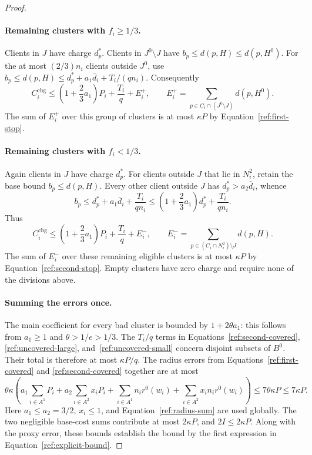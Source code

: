 \begin{proof}
\paragraph{Remaining clusters with $f_i\ge1/3$.}
Clients in $J$ have charge $d_p^*$.  Clients in $J^0\setminus J$ have
$b_p\le d(p,H)\le d(p,H^0)$.  For the at most $(2/3)n_i$ clients outside
$J^0$, use
$b_p\le d(p,H)\le d_p^*+a_1\bar d_i+T_i/(qn_i)$.
Consequently
\begin{equation}\label{ref:uncovered-large}
 C_i^{\mathrm{chg}}
 \le \left(1+\frac23a_1\right)P_i+\frac{T_i}{q}+E_i^+,
 \qquad
 E_i^+=\sum_{p\in C_i\cap(J^0\setminus J)}d(p,H^0).
\end{equation}
The sum of $E_i^+$ over this group of clusters is at most $\kappa P$ by
Equation~\eqref{ref:first-stop}.

\paragraph{Remaining clusters with $f_i<1/3$.}
Again clients in $J$ have charge $d_p^*$.  For clients outside $J$ that lie
in $N_i^2$, retain the base bound $b_p\le d(p,H)$.  Every other client
outside $J$ has $d_p^*>a_2\bar d_i$, whence
\[
 b_p\le d_p^*+a_1\bar d_i+\frac{T_i}{qn_i}
 \le\left(1+\frac23a_1\right)d_p^*+\frac{T_i}{qn_i}.
\]
Thus
\begin{equation}\label{ref:uncovered-small}
 C_i^{\mathrm{chg}}
 \le\left(1+\frac23a_1\right)P_i+\frac{T_i}{q}+E_i^-,
 \qquad
 E_i^-=\sum_{p\in (C_i\cap N_i^2)\setminus J}d(p,H).
\end{equation}
The sum of $E_i^-$ over these remaining eligible clusters is at most
$\kappa P$ by Equation~\eqref{ref:second-stop}.  Empty clusters have zero charge and
require none of the divisions above.

\paragraph{Summing the errors once.}
The main coefficient for every bad cluster is bounded by $1+2\theta a_1$:
this follows from $a_1\ge1$ and $\theta>1/e>1/3$.
The $T_i/q$ terms in Equations~\eqref{ref:second-covered},
\eqref{ref:uncovered-large}, and~\eqref{ref:uncovered-small} concern
disjoint subsets of $B^0$.  Their total is therefore at most $\kappa P/q$.
The radius errors from Equations~\eqref{ref:first-covered} and
\eqref{ref:second-covered} together are at most
\[
 \theta\kappa\left(
   a_1\sum_{i\in A^1}P_i+a_2\sum_{i\in A^2}x_iP_i
   +\sum_{i\in A^1}n_i r^0(w_i)
   +\sum_{i\in A^2}x_in_i r^0(w_i)\right)
 \le 7\theta\kappa P\le7\kappa P.
\]
Here $a_1\le a_2=3/2$, $x_i\le1$, and Equation~\eqref{ref:radius-sum} are used
globally.  The two negligible base-cost sums contribute at most $2\kappa P$,
and $2I\le2\kappa P$. Along with the proxy error, these bounds establish
the bound by the first expression in Equation~\eqref{ref:explicit-bound}.


\end{proof}
